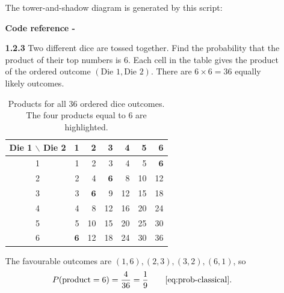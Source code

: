 \begin{enumerate}[label={},leftmargin=0pt]
\begin{enumerate}[label={},leftmargin=4mm,itemsep=9pt]
The tower-and-shadow diagram is generated by this script:
\par\smallskip
\noindent\textbf{Code reference -}
\par\noindent{}
\par\smallskip
\newpage
\setcounter{enumii}{3}
\setcounter{equation}{0}
\item[\textbf{1.2.3}] Two different dice are tossed together. Find the probability that the product of their top numbers is $6$.
\solution Each cell in the table gives the product of the ordered outcome $(\text{Die 1},\text{Die 2})$. There are $6\times6=36$ equally likely outcomes.
\begin{table}[H]\centering\small
\caption{Products for all 36 ordered dice outcomes. The four products equal to 6 are highlighted.}
\setlength{\tabcolsep}{5pt}
\begin{tabular}{c|rrrrrr}
\hline
Die 1 $\backslash$ Die 2 & 1 & 2 & 3 & 4 & 5 & 6\\\hline
1 & 1 & 2 & 3 & 4 & 5 & $\mathbf{6}$\\
2 & 2 & 4 & $\mathbf{6}$ & 8 & 10 & 12\\
3 & 3 & $\mathbf{6}$ & 9 & 12 & 15 & 18\\
4 & 4 & 8 & 12 & 16 & 20 & 24\\
5 & 5 & 10 & 15 & 20 & 25 & 30\\
6 & $\mathbf{6}$ & 12 & 18 & 24 & 30 & 36\\
\hline
\end{tabular}\end{table}
The favourable outcomes are $(1,6),(2,3),(3,2),(6,1)$, so
\begin{equation*}
P(\text{product}=6)=\frac4{36}=\frac19\qquad\eqref{eq:prob-classical}.
\end{equation*}




\end{enumerate}
\end{enumerate}

